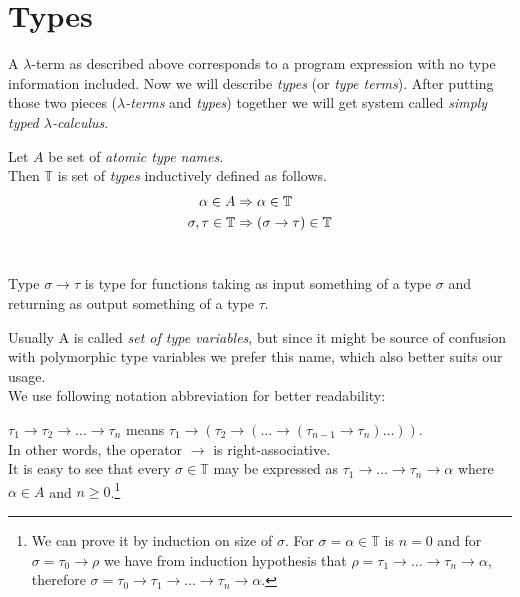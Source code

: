 \documentclass[12pt,a4paper]{report}
\newcommand{\lterm}{$\lambda$-term\xspace}
\newcommand{\lterms}{$\lambda$-terms\xspace}
\begin{document}
\section{Types}
\label{deftype}

\newcommand{\ar}{\rightarrow\xspace}
\newcommand{\T}{\mathbb{T}\xspace}

A \lterm as described above
corresponds to a program expression with no type information
included. Now we will describe \textit{types} (or \textit{type terms}).
After putting those two pieces 
(\textit{\lterms} and \textit{types}) together 
we will get system called \textit{simply typed $\lambda$-calculus}.


\begin{definition}
Let $A$ be set of {\it atomic type names}. \\
Then $\mathbb{T}$ is set of {\it types} inductively defined as follows.
\begin{align*}
\alpha      \in A  &\then   \alpha \in \T \\
\sigma,\tau \in \T &\then ( \sigma \ar  \tau ) \in \T 
\end{align*}~

\end{definition}

Type $\sigma \ar \tau$ is type for functions taking as input
something of a type $\sigma$ and returning 
as output something of a type $\tau$. 

Usually A is called \textit{set of type variables}, 
but since it might be source of confusion with polymorphic type variables
we prefer this name, which also better suits our usage. 
\\

We use following notation
abbreviation for better readability:

$\tau_1 \ar \tau_2 \ar \dots \ar \tau_n$ means 
$\tau_1 \ar (\tau_2 \ar (\dots \ar (\tau_{n-1} \ar \tau_n)\dots))$.\\

In other words, the operator $\ar$ is right-associative.\\

It is easy to see that every $\sigma \in \T$ may be expressed as 
$\tau_1 \ar \dots \ar \tau_n \ar \alpha$ 
where $\alpha \in A$ and $n \geq 0$.\footnote{ 
We can prove it by induction on size of $\sigma$. 
For $\sigma = \alpha \in \T$ is $n = 0$ and for $\sigma = \tau_0 \ar \rho$
we have from induction hypothesis that $\rho = \tau_1 \ar \dots \ar \tau_n \ar \alpha$,
therefore
$\sigma = \tau_0 \ar \tau_1 \ar \dots \ar \tau_n \ar \alpha$.}
\end{document}
